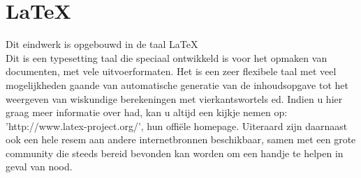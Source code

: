 \chapter{\LaTeX}
Dit eindwerk is opgebouwd in de taal \LaTeX\\
Dit is een typesetting taal die speciaal ontwikkeld is voor het opmaken van documenten, met vele uitvoerformaten. Het is een zeer flexibele taal met veel mogelijkheden gaande van automatische generatie van de inhoudsopgave tot het weergeven van wiskundige berekeningen met vierkantswortels ed. Indien u hier graag meer informatie over had, kan u altijd een kijkje nemen op: 'http://www.latex-project.org/', hun offi\"ele homepage. Uiteraard zijn daarnaast ook een hele resem aan andere internetbronnen beschikbaar, samen met een grote community die steeds bereid bevonden kan worden om een handje te helpen in geval van nood.
